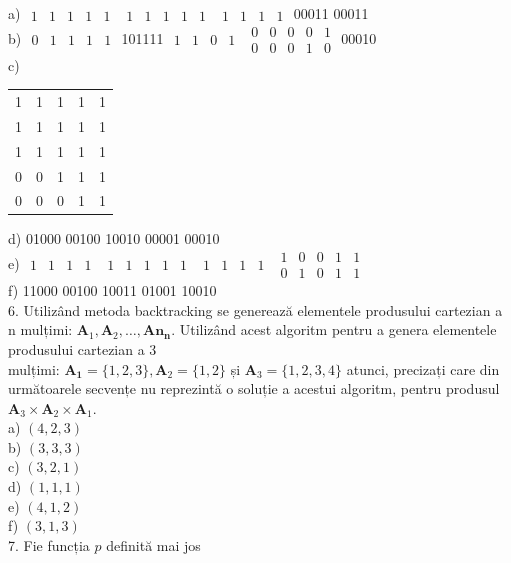 \documentclass[10pt]{article}
\begin{document}
a) $\begin{array}{lllll}1 & 1 & 1 & 1 & 1\end{array}$ $\begin{array}{lllll}1 & 1 & 1 & 1 & 1\end{array}$ $\begin{array}{lllll}1 & 1 & 1 & 1\end{array}$ 00011 00011\\
b) $\begin{array}{lllll}0 & 1 & 1 & 1 & 1\end{array}$ 101111 $\begin{array}{lllll}1 & 1 & 0 & 1\end{array}$ $\begin{array}{lllll}0 & 0 & 0 & 0 & 1 \\ 0 & 0 & 0 & 1 & 0\end{array}$ 00010\\
c)

\begin{center}
\begin{tabular}{lllll}
1 & 1 & 1 & 1 & 1 \\
1 & 1 & 1 & 1 & 1 \\
1 & 1 & 1 & 1 & 1 \\
0 & 0 & 1 & 1 & 1 \\
0 & 0 & 0 & 1 & 1 \\
\end{tabular}
\end{center}

d) 01000 00100 10010 00001 00010\\
e) $\begin{array}{lllll}1 & 1 & 1 & 1\end{array}$ $\begin{array}{lllll}1 & 1 & 1 & 1 & 1\end{array}$ $\begin{array}{lllll}1 & 1 & 1 & 1\end{array}$ $\begin{array}{lllll}1 & 0 & 0 & 1 & 1 \\ 0 & 1 & 0 & 1 & 1\end{array}$\\
f) 11000 00100 10011 01001 10010\\
6. Utilizând metoda backtracking se generează elementele produsului cartezian a n mulțimi: $\mathbf{A}_{1}, \mathbf{A}_{2}, \ldots, \mathbf{A n}_{\mathbf{n}}$. Utilizând acest algoritm pentru a genera elementele produsului cartezian a 3\\
mulțimi: $\mathbf{A}_{\mathbf{1}}=\{1,2,3\}, \mathbf{A}_{2}=\{1,2\}$ și $\mathbf{A}_{3}=\{1,2,3,4\}$ atunci, precizați care din următoarele secvențe nu reprezintă o soluție a acestui algoritm, pentru produsul $\mathbf{A}_{3} \times \mathbf{A}_{2} \times \mathbf{A}_{1}$.\\
a) $(4,2,3)$\\
b) $(3,3,3)$\\
c) $(3,2,1)$\\
d) $(1,1,1)$\\
e) $(4,1,2)$\\
f) $(3,1,3)$\\
7. Fie funcția $p$ definită mai jos
\end{document}
